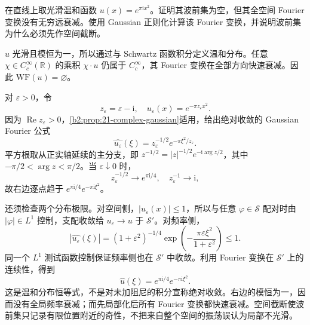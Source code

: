 \begin{exercise}\label{b2:ex:app-G-5}
在直线上取光滑温和函数 \(u(x)=e^{\pi\mathrm ix^2}\)。证明其波前集为空，但其全空间 Fourier 变换没有无穷远衰减。使用 Gaussian 正则化计算该 Fourier 变换，并说明波前集为什么必须先作空间截断。
\end{exercise}
\begin{solution}
\(u\) 光滑且模恒为一，所以通过与 Schwartz 函数积分定义温和分布。任意 \(\chi\in C_c^\infty(\mathbb R)\) 的乘积 \(\chi\cdot u\) 仍属于 \(C_c^\infty\)，其 Fourier 变换在全部方向快速衰减。因此 \(\mathrm{WF}(u)=\varnothing\)。

对 \(\varepsilon>0\)，令
\[
 z_\varepsilon=\varepsilon-\mathrm i,
 \quad u_\varepsilon(x)=e^{-\pi z_\varepsilon x^2}.
\]
因为 \(\operatorname{Re}z_\varepsilon>0\)，\cref{b2:prop:21-complex-gaussian}适用，给出绝对收敛的 Gaussian Fourier 公式
\[
 \widehat{u_\varepsilon}(\xi)
 =z_\varepsilon^{-1/2}e^{-\pi\xi^2/z_\varepsilon}.
\]
平方根取从正实轴延续的主分支，即
\(z^{-1/2}=|z|^{-1/2}e^{-\mathrm i\arg z/2}\)，其中
\(-\pi/2<\arg z<\pi/2\)。当 \(\varepsilon\downarrow0\) 时，
\[
 z_\varepsilon^{-1/2}\longrightarrow e^{\pi\mathrm i/4},
 \quad z_\varepsilon^{-1}\longrightarrow\mathrm i,
\]
故右边逐点趋于 \(e^{\pi\mathrm i/4}e^{-\pi\mathrm i\xi^2}\)。

还须检查两个分布极限。对空间侧，\(|u_\varepsilon(x)|\le1\)，所以与任意 \(\varphi\in\mathcal S\) 配对时由 \(|\varphi|\in L^1\) 控制，支配收敛给 \(u_\varepsilon\to u\) 于 \(\mathcal S'\)。对频率侧，
\[
 |\widehat{u_\varepsilon}(\xi)|
 =(1+\varepsilon^2)^{-1/4}
   \exp\left(-\frac{\pi\varepsilon\xi^2}{1+\varepsilon^2}\right)
 \le1.
\]
同一个 \(L^1\) 测试函数控制保证频率侧也在 \(\mathcal S'\) 中收敛。利用 Fourier 变换在 \(\mathcal S'\) 上的连续性，得到
\[
 \widehat u(\xi)=e^{\pi\mathrm i/4}e^{-\pi\mathrm i\xi^2}.
\]
这是温和分布恒等式，不是对未加阻尼的积分宣称绝对收敛。右边的模恒为一，因而没有全局频率衰减；而先局部化后所有 Fourier 变换都快速衰减。空间截断使波前集只记录有限位置附近的奇性，不把来自整个空间的振荡误认为局部不光滑。
\end{solution}

